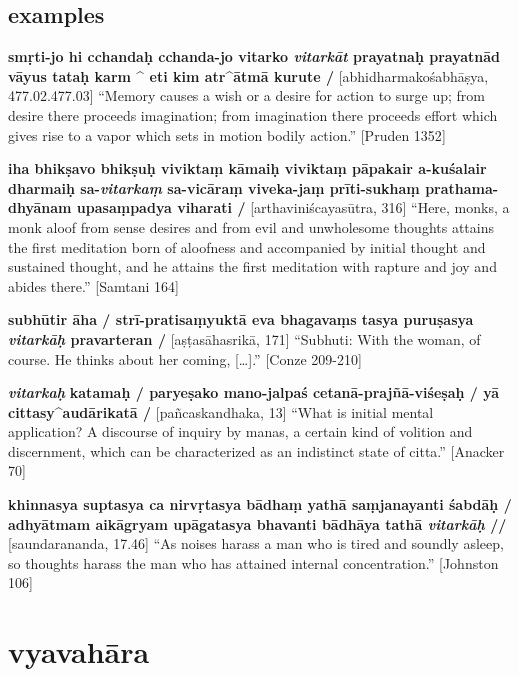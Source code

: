 \documentclass[
  letterpaper,
  DIV=11,
  numbers=noendperiod,
  oneside]{scrreprt}
\begin{document}
\hypertarget{examples-1}{%
\section{examples}\label{examples-1}}

\textbf{smṛti-jo hi cchandaḥ cchanda-jo vitarko \emph{vitarkāt}
prayatnaḥ prayatnād vāyus tataḥ karm \^{} eti kim atr\^{}ātmā kurute /}
{[}abhidharmakośabhāṣya, 477.02.477.03{]} ``Memory causes a wish or a
desire for action to surge up; from desire there proceeds imagination;
from imagination there proceeds effort which gives rise to a vapor which
sets in motion bodily action.'' {[}Pruden 1352{]}

\textbf{iha bhikṣavo bhikṣuḥ viviktaṃ kāmaiḥ viviktaṃ pāpakair
a-kuśalair dharmaiḥ sa-\emph{vitarkaṃ} sa-vicāraṃ viveka-jaṃ
prīti-sukhaṃ prathama-dhyānam upasaṃpadya viharati /}
{[}arthaviniścayasūtra, 316{]} ``Here, monks, a monk aloof from sense
desires and from evil and unwholesome thoughts attains the first
meditation born of aloofness and accompanied by initial thought and
sustained thought, and he attains the first meditation with rapture and
joy and abides there.'' {[}Samtani 164{]}

\textbf{subhūtir āha / strī-pratisaṃyuktā eva bhagavaṃs tasya puruṣasya
\emph{vitarkāḥ} pravarteran /} {[}aṣṭasāhasrikā, 171{]} ``Subhuti: With
the woman, of course. He thinks about her coming, {[}\ldots{]}.''
{[}Conze 209-210{]}

\textbf{\emph{vitarkaḥ}} \textbf{katamaḥ / paryeṣako mano-jalpaś
cetanā-prajñā-viśeṣaḥ / yā cittasy\^{}audārikatā /} {[}pañcaskandhaka,
13{]} ``What is initial mental application? A discourse of inquiry by
manas, a certain kind of volition and discernment, which can be
characterized as an indistinct state of citta.'' {[}Anacker 70{]}

\textbf{khinnasya suptasya ca nirvṛtasya bādhaṃ yathā saṃjanayanti
śabdāḥ / adhyātmam aikāgryam upāgatasya bhavanti bādhāya tathā
\emph{vitarkāḥ} //} {[}saundarananda, 17.46{]} ``As noises harass a man
who is tired and soundly asleep, so thoughts harass the man who has
attained internal concentration.'' {[}Johnston 106{]}


\hypertarget{vyavahux101ra}{%
\chapter{vyavahāra}\label{vyavahux101ra}}

\end{document}
